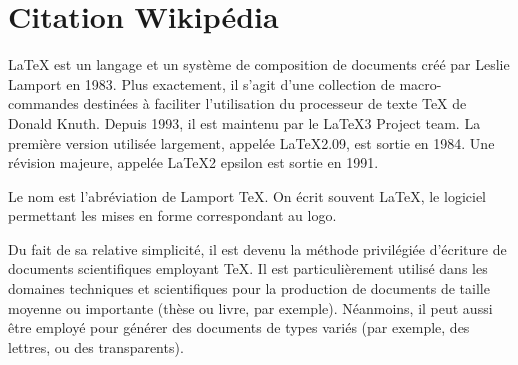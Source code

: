 \section{Citation Wikipédia}
\label{p2}

LaTeX est un langage et un système de composition de documents créé par Leslie Lamport en 1983.
Plus exactement, il s'agit d'une collection de macro-commandes destinées à faciliter l'utilisation du \og processeur de texte \fg{} TeX de Donald Knuth.
Depuis 1993, il est maintenu par le LaTeX3 Project team.
La première version utilisée largement, appelée LaTeX2.09, est sortie en 1984.
Une révision majeure, appelée LaTeX2 epsilon est sortie en 1991.

Le nom est l'abréviation de Lamport TeX. On écrit souvent \LaTeX, le logiciel permettant les mises en forme correspondant au logo.

Du fait de sa relative simplicité, il est devenu la méthode privilégiée d'écriture de documents scientifiques employant TeX.
Il est particulièrement utilisé dans les domaines techniques et scientifiques pour la production de documents de taille moyenne ou importante (thèse ou livre, par exemple).
Néanmoins, il peut aussi être employé pour générer des documents de types variés (par exemple, des lettres, ou des transparents).
